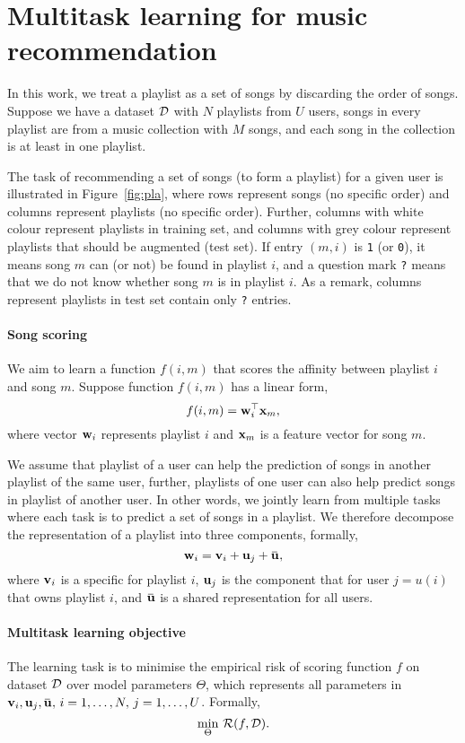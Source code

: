 \section{Multitask learning for music recommendation}

In this work, we treat a playlist as a set of songs by discarding the order of songs.
Suppose we have a dataset $\mathcal{D}$ with $N$ playlists from $U$ users, songs in every playlist are from a music collection 
with $M$ songs, and each song in the collection is at least in one playlist.

The task of recommending a set of songs (to form a playlist) for a given user is illustrated in Figure~\ref{fig:pla},
where rows represent songs (no specific order) and columns represent playlists (no specific order).
Further, columns with white colour represent playlists in training set, 
and columns with grey colour represent playlists that should be augmented (\ie test set).
If entry $(m, i)$ is \texttt{1} (or \texttt{0}), 
it means song $m$ can (or not) be found in playlist $i$,
and a question mark \texttt{?} means that we do not know whether song $m$ is in playlist $i$.
As a remark, columns represent playlists in test set contain only \texttt{?} entries.




\paragraph{Song scoring}
%
We aim to learn a function $f(i, m)$ that scores the affinity between playlist $i$ and song $m$.
Suppose function $f(i, m)$ has a linear form, \ie
$$
f(i, m) = \mathbf{w}_i^\top \mathbf{x}_m,
$$
where vector $\mathbf{w}_i$ represents playlist $i$ and $\mathbf{x}_m$ is a feature vector for song $m$.

We assume that playlist of a user can help the prediction of songs in another playlist of the same user,
further, playlists of one user can also help predict songs in playlist of another user.
In other words, we jointly learn from multiple tasks where each task is to predict a set of songs in a playlist.
We therefore decompose the representation of a playlist into three components, formally,
$$
\w_i = \bv_i + \bu_j + \widebar\bu,
$$
where $\mathbf{v}_i$ is a specific for playlist $i$, $\mathbf{u}_j$ is the component that for user $j=u(i)$ that owns playlist $i$,
and $\widebar\bu$ is a shared representation for all users.


\paragraph{Multitask learning objective}
%
The learning task is to minimise the empirical risk of scoring function $f$ on dataset $\mathcal{D}$ over model parameters $\Theta$,
which represents all parameters in $\bv_i, \bu_j, \widebar\bu, \, i=1,\dots,N, \, j=1,\dots,U$.
Formally,
$$
\min_{\Theta} \, \mathcal{R}(f, \mathcal{D}).
$$

